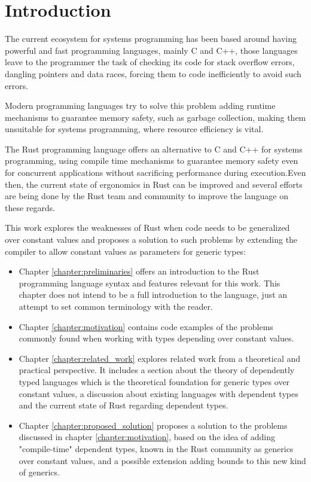 \chapter{Introduction}
\label{chapter:introduction}
The current ecosystem for systems programming has been based around having powerful and fast programming languages, mainly C and C++, those languages leave to the programmer the task of checking its code for stack overflow errors, dangling pointers and data races, forcing them to code inefficiently to avoid such errors.

Modern programming languages try to solve this problem adding runtime mechanisms to guarantee memory safety, such as garbage collection, making them unsuitable for systems programming, where resource efficiency is vital.

The Rust programming language offers an alternative to C and C++ for systems programming, using compile time mechanisms to guarantee memory safety even for concurrent applications without sacrificing performance during execution.Even then, the current state of ergonomics in Rust can be improved and several efforts are being done by the Rust team and community to improve the language on these regards.

This work explores the weaknesses of Rust when code needs to be generalized over constant values and proposes a solution to such problems by extending the compiler to allow constant values as parameters for generic types:
\begin{itemize}
    \item Chapter \ref{chapter:preliminaries} offers an introduction to the Rust programming language syntax and features relevant for this work. This chapter does not intend to be a full introduction to the language, just an attempt to set common terminology with the reader.
    \item Chapter \ref{chapter:motivation} contains code examples of the problems commonly found when working with types depending over constant values. 
    \item Chapter \ref{chapter:related_work} explores related work from a theoretical and practical perspective. It includes a section about the theory of dependently typed languages which is the theoretical foundation for generic types over constant values, a discussion about existing languages with dependent types and the current state of Rust regarding dependent types.
    \item Chapter \ref{chapter:proposed_solution} proposes a solution to the problems discussed in chapter \ref{chapter:motivation}, based on the idea of adding "compile-time" dependent types, known in the Rust community as generics over constant values, and a possible extension adding bounds to this new kind of generics.
\end{itemize}
